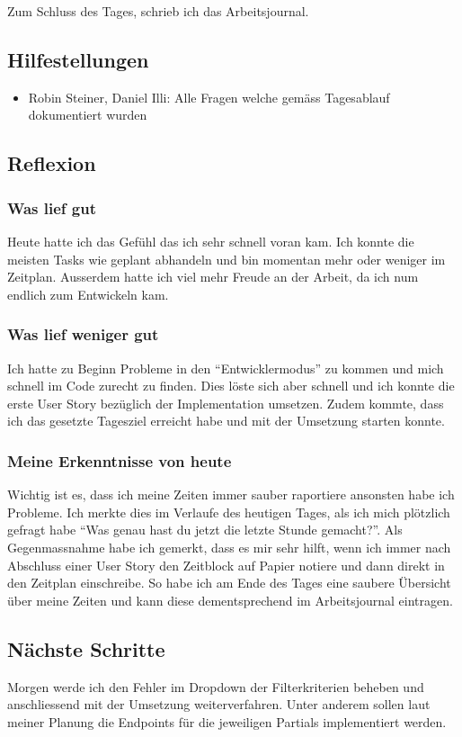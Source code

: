 Zum Schluss des Tages, schrieb ich das Arbeitsjournal.

\subsection*{Hilfestellungen}
\begin{itemize}
    \item Robin Steiner, Daniel Illi: Alle Fragen welche gemäss Tagesablauf dokumentiert wurden
\end{itemize}

\subsection*{Reflexion}

\subsubsection*{Was lief gut}
Heute hatte ich das Gefühl das ich sehr schnell voran kam. Ich konnte die meisten Tasks wie geplant abhandeln und bin 
momentan mehr oder weniger im Zeitplan. Ausserdem hatte ich viel mehr Freude an der Arbeit, da ich num endlich zum Entwickeln kam.

\subsubsection*{Was lief weniger gut}
Ich hatte zu Beginn Probleme in den ``Entwicklermodus'' zu kommen und mich schnell im Code zurecht zu finden.
Dies löste sich aber schnell und ich konnte die erste User Story bezüglich der Implementation umsetzen. Zudem kommte, dass ich das 
gesetzte Tagesziel erreicht habe und mit der Umsetzung starten konnte.

\subsubsection*{Meine Erkenntnisse von heute}
Wichtig ist es, dass ich meine Zeiten immer sauber raportiere ansonsten habe ich Probleme. Ich merkte dies im Verlaufe des heutigen Tages, als ich mich plötzlich gefragt habe ``Was genau hast du jetzt die letzte Stunde gemacht?''.
Als Gegenmassnahme habe ich gemerkt, dass es mir sehr hilft,
wenn ich immer nach Abschluss einer User Story den Zeitblock auf Papier notiere und dann direkt in den Zeitplan einschreibe. So habe ich am Ende 
des Tages eine saubere Übersicht über meine Zeiten und kann diese dementsprechend im Arbeitsjournal eintragen.

\subsection*{Nächste Schritte}
Morgen werde ich den Fehler im Dropdown der Filterkriterien beheben und anschliessend mit der Umsetzung weiterverfahren. Unter anderem sollen laut
meiner Planung die Endpoints für die jeweiligen Partials implementiert werden.

\pagebreak

